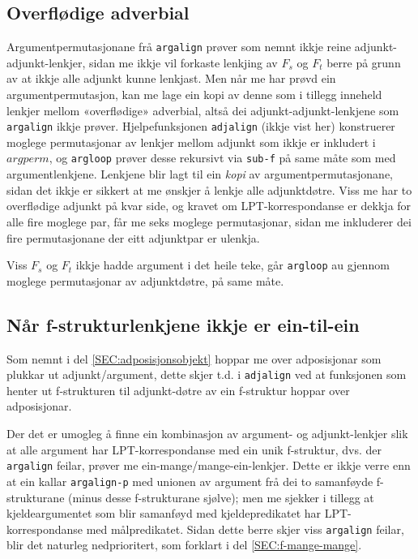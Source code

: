 \documentclass[11pt,a4paper,oneside,draft]{report}
\begin{document}
\subsection{Overflødige adverbial}
\label{sec-4.1.1}

   \label{SEC:impl-adjalign}

Argumentpermutasjonane frå \texttt{argalign} prøver som nemnt ikkje reine
adjunkt-adjunkt-lenkjer, sidan me ikkje vil forkaste lenkjing av $F_s$
og $F_t$ berre på grunn av at ikkje alle adjunkt kunne lenkjast. Men
når me har prøvd ein argumentpermutasjon, kan me lage ein kopi av
denne som i tillegg inneheld lenkjer mellom «overflødige» adverbial,
altså dei adjunkt-adjunkt-lenkjene som \texttt{argalign} ikkje
prøver. Hjelpefunksjonen \texttt{adjalign} (ikkje vist her) konstruerer
moglege permutasjonar av lenkjer mellom adjunkt som ikkje er inkludert
i $argperm$, og \texttt{argloop} prøver desse rekursivt via \texttt{sub-f} på same
måte som med argumentlenkjene. Lenkjene blir lagt til ein \emph{kopi} av
argumentpermutasjonane, sidan det ikkje er sikkert at me ønskjer å
lenkje alle adjunktdøtre. Viss me har to overflødige adjunkt på kvar
side, og kravet om LPT-korrespondanse er dekkja for alle fire moglege
par, får me seks moglege permutasjonar, sidan me inkluderer dei fire
permutasjonane der eitt adjunktpar er ulenkja.

Viss $F_s$ og $F_t$ ikkje hadde argument i det heile teke, går
\texttt{argloop} au gjennom moglege permutasjonar av adjunktdøtre, på same
måte.
\subsection{Når f-strukturlenkjene ikkje er ein-til-ein}
\label{sec-4.1.2}

 Som nemnt i del \ref{SEC:adposisjonsobjekt} hoppar me over
 adposisjonar som plukkar ut adjunkt/argument, dette skjer t.d. i
 \texttt{adjalign} ved at funksjonen som henter ut f-strukturen til
 adjunkt-døtre av ein f-struktur hoppar over adposisjonar.

 Der det er umogleg å finne ein kombinasjon av argument- og
 adjunkt-lenkjer slik at alle argument har LPT-korrespondanse med ein
 unik f-struktur, dvs. der \texttt{argalign} feilar, prøver me
 ein-mange/mange-ein-lenkjer. Dette er ikkje verre enn at ein kallar
 \texttt{argalign-p} med unionen av argument frå dei to samanføyde
 f-strukturane (minus desse f-strukturane sjølve); men me sjekker i
 tillegg at kjeldeargumentet som blir samanføyd med kjeldepredikatet
 har LPT-korrespondanse med målpredikatet. Sidan dette berre skjer
 viss \texttt{argalign} feilar, blir det naturleg nedprioritert, som forklart
 i del \ref{SEC:f-mange-mange}.
\end{document}
